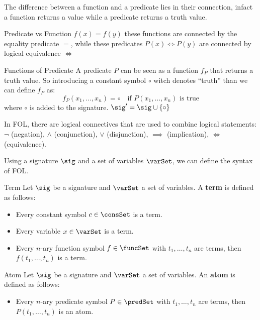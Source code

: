The difference between a function and a predicate lies in their 
connection, infact a function returns a value while a predicate returns a truth value.

\begin{example}{Predicate vs Function}
    $f(x) = f(y)$ these functions are connected by the equality predicate $=$, 
    while these predicates $P(x) \iff P(y)$ are connected by logical equivalence $\iff$
\end{example}

\begin{remark}{Functions of Predicate}
    A predicate $P$ can be seen as a function $f_P$ that returns a truth value.
    So introducing a constant symbol
    $\circ$ witch denotes ``truth'' than we can define $f_P$ as:
    \begin{equation*}
        f_P(x_1,\dots,x_n) = \circ \quad \text{if } P(x_1,\dots,x_n) \text{ is true}
    \end{equation*} 
    where $\circ$ is added to the signature. 
    $\sig' = \sig \cup \{\circ\}$  
\end{remark}

In FOL, there are logical connectives that 
are used to combine logical statements:
$\neg$ (negation), $\land$ (conjunction), $\lor$ (disjunction), 
$\implies$ (implication), $\iff$ (equivalence).

Using a signature $\sig$ and 
a set of variables $\varSet$, we can define the syntax of FOL.

\begin{definition}{Term}
    Let $\sig$ be a signature and $\varSet$ a set of variables.
    A \textbf{term} is defined as follows:
    \begin{itemize}
        \item Every constant symbol $c \in \consSet$ is a term.
        \item Every variable $x \in \varSet$ is a term.
        \item Every $n$-ary function symbol $f \in \funcSet$ with $t_1,\dots,t_n$ are terms, 
        then $f(t_1,\dots,t_n)$ is a term.
    \end{itemize}
\end{definition}

\begin{definition}{Atom}
    Let $\sig$ be a signature and $\varSet$ a set of variables.
    An \textbf{atom} is defined as follows:
    \begin{itemize}
        \item Every $n$-ary predicate symbol $P \in \predSet$ with $t_1,\dots,t_n$ are terms, 
        then $P(t_1,\dots,t_n)$ is an atom.
    \end{itemize}    
\end{definition}

